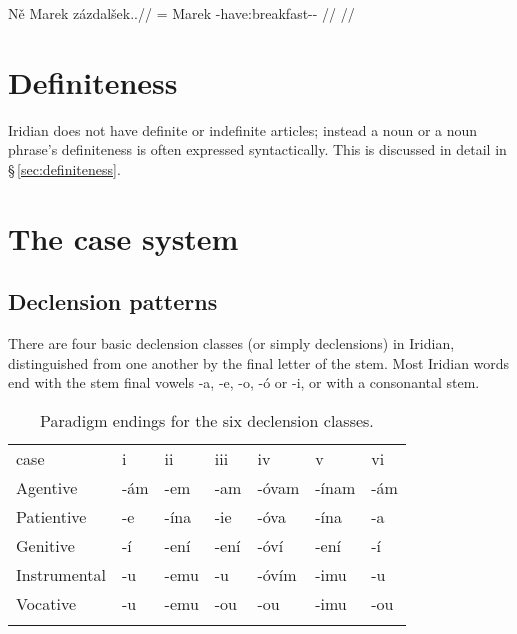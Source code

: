 \pex
\begingl
    \gla N\v{e} Marek zázdalšek..//
    \glb \Pl{}= Marek \Neg{}-have:breakfast-\Av{}-\Pf{} //
    \glft {}//
\endgl
\xe


\section{Definiteness}
Iridian does not have definite or indefinite articles; instead a noun or a noun phrase's definiteness is often expressed syntactically. This is discussed in detail in \S\,\ref{sec:definiteness}.

\section{The case system}

\subsection{Declension patterns}

There are four basic declension classes (or simply declensions) in Iridian, distinguished from one another by the final letter of the stem. Most Iridian words end with the stem final vowels -a, -e, -o, -ó or -i, or with a consonantal stem.


\begin{table}[h]
    \small
    \caption{Paradigm endings for the six declension classes.}
    \medskip
    \begin{tabu} to \textwidth {Y[2]YYYYYY}
    \toprule\addlinespace
            {\sc case}          &{\sc i} &{\sc ii} & {\sc iii} &{\sc iv} &{\sc v} &{\sc vi} \\ \addlinespace
    \midrule\addlinespace
        Agentive    & -ám   & -em     & -am    & -óvam  & -ínam    & -ám\\ \addlinespace
        Patientive  & -e      & -ína  & -ie    & -óva   & -ína     & -a\\ \addlinespace
        Genitive    & -í    & -ení  & -ení & -óví & -ení     & -í\\ \addlinespace
        Instrumental& -u      & -emu    & -u     & -óv\'im  & -imu       & -u\\ \addlinespace
        Vocative    & -u      & -emu    & -ou    & -ou      & -imu       & -ou\\ \addlinespace
    \bottomrule
    \end{tabu}
\end{table}


